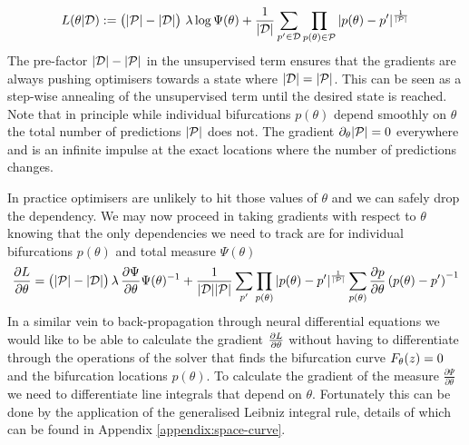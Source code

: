 \begin{align}
    L(\theta|\mathcal{D}):=
    \big(|\mathcal{P}|-|\mathcal{D}|\big)\,\,\lambda \log\Psi(\theta)+
    \frac{1}{|\mathcal{D}|}\sum_{p'\in\mathcal{D}}
    \prod_{p(\theta)\in\mathcal{P}}|p(\theta)-p'|
    ^{\frac{1}{|\mathcal{P}|}}
    \label{eq:cost}
\end{align}
The pre-factor $|\mathcal{D}|-|\mathcal{P}|$ in the unsupervised term ensures that the gradients are always pushing optimisers towards a state where $|\mathcal{D}|=|\mathcal{P}|$. This can be seen as a step-wise annealing of the unsupervised term until the desired state is reached. Note that in principle while individual bifurcations $p(\theta)$ depend smoothly on $\theta$ the total number of predictions $|\mathcal{P}|$ does not. The gradient $\partial_{\theta}|\mathcal{P}|=0$ everywhere and is an infinite impulse at the exact locations where the number of predictions changes.

In practice optimisers are unlikely to hit those values of $\theta$ and we can safely drop the dependency. We may now proceed in taking gradients with respect to $\theta$ knowing that the only dependencies we need to track are for individual bifurcations $p(\theta)$ and total measure $\Psi(\theta)$
\begin{align}
    \frac{\partial L}{\partial\theta}=
    \big(|\mathcal{P}|-|\mathcal{D}|\big)\,\lambda\,
    \frac{\partial \Psi}{\partial\theta}\Psi(\theta)^{-1}+
    \frac{1}{|\mathcal{D}||\mathcal{P}|}\sum_{p'}
    \prod_{p(\theta)}|p(\theta)-p'|^{\frac{1}{|\mathcal{P}|}}
    \sum_{p(\theta)}\frac{\partial p}{\partial\theta}\left(p(\theta)-p'\right)^{-1}
    \label{eq:gradient}
\end{align}
In a similar vein to back-propagation through neural differential equations \cite{Chen2018NeuralEquations} we would like to be able to calculate the gradient $\frac{\partial L}{\partial\theta}$ without having to differentiate through the operations of the solver that finds the bifurcation curve $F_{\theta}(z)=0$ and the bifurcation locations $p(\theta)$. To calculate the gradient of the measure $\frac{\partial \Psi}{\partial\theta}$ we need to differentiate line integrals that depend on $\theta$. Fortunately this can be done by the application of the generalised Leibniz integral rule, details of which can be found in Appendix \ref{appendix:space-curve}.

